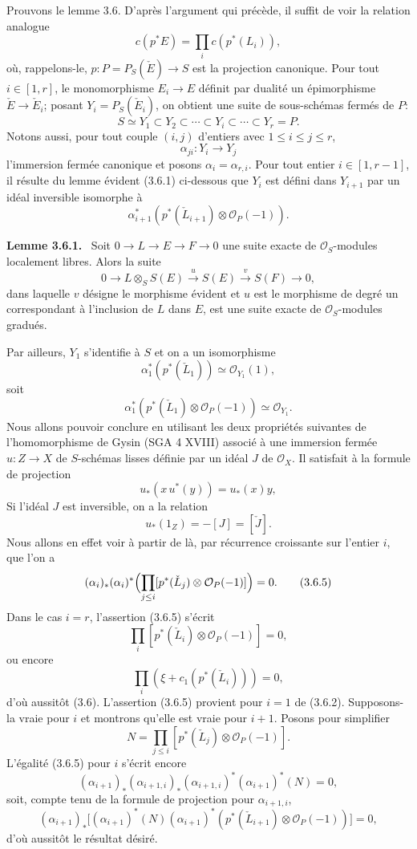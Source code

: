 \documentclass[11pt]{article}
\newenvironment{statement}[1]{\par\medskip\noindent\textbf{#1.}\ }{\par\medskip}
\begin{document}
Prouvons le lemme 3.6. D'après l'argument qui précède, il suffit de voir la relation analogue
\[
c(p^*E)=\prod_i c(p^*(L_i)),
\]
où, rappelons-le, $p:P=P_S(\check E)\to S$ est la projection canonique. Pour tout $i\in[1,r]$, le monomorphisme $E_i\to E$ définit par dualité un épimorphisme $\check E\to\check E_i$; posant $Y_i=P_S(\check E_i)$, on obtient une suite de sous-schémas fermés de $P$:
\[
S\simeq Y_1\subset Y_2\subset\cdots\subset Y_i\subset\cdots\subset Y_r=P.
\]
Notons aussi, pour tout couple $(i,j)$ d'entiers avec $1\le i\le j\le r$,
\[
\alpha_{ji}:Y_i\to Y_j
\]
l'immersion fermée canonique et posons $\alpha_i=\alpha_{r,i}$. Pour tout entier $i\in[1,r-1]$, il résulte du lemme évident (3.6.1) ci-dessous que $Y_i$ est défini dans $Y_{i+1}$ par un idéal inversible isomorphe à
\[
\alpha_{i+1}^*(p^*(\check L_{i+1})\otimes\mathcal O_P(-1)).
\]

\begin{statement}{Lemme 3.6.1}
Soit $0\to L\to E\to F\to0$ une suite exacte de $\mathcal O_S$-modules localement libres. Alors la suite
\[
0\to L\otimes_S S(E)\xrightarrow{u}S(E)\xrightarrow{v}S(F)\to0,
\]
dans laquelle $v$ désigne le morphisme évident et $u$ est le morphisme de degré un correspondant à l'inclusion de $L$ dans $E$, est une suite exacte de $\mathcal O_S$-modules gradués.
\end{statement}

Par ailleurs, $Y_1$ s'identifie à $S$ et on a un isomorphisme
\[
\alpha_1^*(p^*(\check L_1))\simeq\mathcal O_{Y_1}(1),
\]
soit
\[
\alpha_1^*(p^*(\check L_1)\otimes\mathcal O_P(-1))\simeq \mathcal O_{Y_1}.
\tag{3.6.2}
\]
Nous allons pouvoir conclure en utilisant les deux propriétés suivantes de l'homomorphisme de Gysin (SGA 4 XVIII) associé à une immersion fermée $u:Z\to X$ de $S$-schémas lisses définie par un idéal $J$ de $\mathcal O_X$. Il satisfait à la formule de projection
\[
u_*(x\,u^*(y))=u_*(x)y,
\tag{3.6.3}
\]
Si l'idéal $J$ est inversible, on a la relation
\[
u_*(1_Z)=-[J]=[\check J].
\tag{3.6.4}
\]
Nous allons en effet voir à partir de là, par récurrence croissante sur l'entier $i$, que l'on a
\[
(\alpha_i)_*(\alpha_i)^*\Bigl(\prod_{j\le i}[p^*(\check L_j)\otimes\mathcal O_P(-1)]\Bigr)=0.
\tag{3.6.5}
\]
Dans le cas $i=r$, l'assertion (3.6.5) s'écrit
\[
\prod_i[p^*(\check L_i)\otimes\mathcal O_P(-1)]=0,
\]
ou encore
\[
\prod_i(\xi+c_1(p^*(\check L_i)))=0,
\]
d'où aussitôt (3.6). L'assertion (3.6.5) provient pour $i=1$ de (3.6.2). Supposons-la vraie pour $i$ et montrons qu'elle est vraie pour $i+1$. Posons pour simplifier
\[
N=\prod_{j\le i}[p^*(\check L_j)\otimes\mathcal O_P(-1)].
\]
L'égalité (3.6.5) pour $i$ s'écrit encore
\[
(\alpha_{i+1})_*(\alpha_{i+1,i})_*(\alpha_{i+1,i})^*(\alpha_{i+1})^*(N)=0,
\]
soit, compte tenu de la formule de projection pour $\alpha_{i+1,i}$,
\[
(\alpha_{i+1})_*\bigl[(\alpha_{i+1})^*(N)(\alpha_{i+1})^*(p^*(\check L_{i+1})\otimes\mathcal O_P(-1))\bigr]=0,
\]
d'où aussitôt le résultat désiré.
\end{document}
